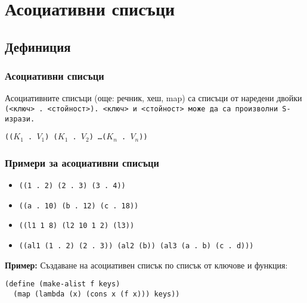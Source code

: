 \documentclass[alsotrans]{beamerswitch}
\begin{document}
\section{Асоциативни списъци}

\subsection{Дефиниция}

\begin{frame}
  \frametitle{Асоциативни списъци}

  \begin{definition}
    Асоциативните списъци (още: речник, хеш, map) са списъци от наредени двойки \tt(<ключ> \tt. <стойност>\tt). <ключ> и <стойност> може да са произволни S-изрази.
  \end{definition}
  \vspace{2ex}
  \tt{((}$K_1$ \tt. $V_1$\tt) \tt($K_1$ \tt. $V_2$\tt) \ldots \tt($K_n$ \tt. $V_n$\tt{))}\\[2ex]
\end{frame}

\begin{frame}[fragile]
  \frametitle{Примери за асоциативни списъци}

  \begin{itemize}[<+->]
  \item \tt{((1 . 2) (2 . 3) (3 . 4))}
  \item \tt{((a . 10) (b . 12) (c . 18))}
  \item \tt{((l1 1 8) (l2 10 1 2) (l3))}
  \item \tt{((al1 (1 . 2) (2 . 3)) (al2 (b)) (al3 (a . b) (c . d)))}
  \end{itemize}
  \vspace{2ex}
  \onslide<+->
  \textbf{Пример:}
  Създаване на асоциативен списък по списък от ключове и функция:
\begin{lstlisting}
(define (make-alist f keys)
  (map (lambda (x) (cons x (f x))) keys))
\end{lstlisting}
  \onslide<+->
\end{frame}
\end{document}
